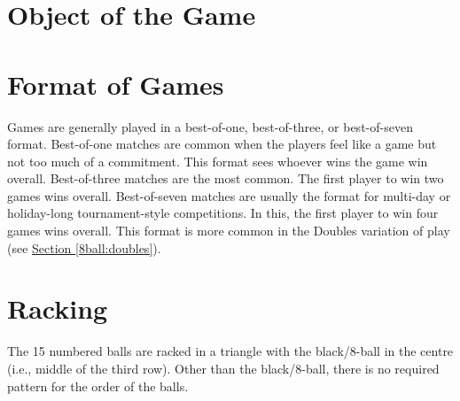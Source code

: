 
\section{Object of the Game} \label{8ball:description}

\section{Format of Games} \label{8ball:format}
 Games are generally played in a best-of-one, best-of-three, or best-of-seven format.%
\subruleitem Best-of-one matches are common when the players feel like a game but not too much of a commitment. This format sees whoever wins the game win overall.%
\subruleitem Best-of-three matches are the most common. The first player to win two games wins overall.%
\subruleitem Best-of-seven matches are usually the format for multi-day or holiday-long tournament-style competitions. In this, the first player to win four games wins overall. This format is more common in the Doubles variation of play (see \hyperref[8ball:doubles]{Section \ref*{8ball:doubles}}).%

\section{Racking} \label{8ball:racking}
 \RackingUp[8ball]%
\label{8ball:challengerracks}\DetermineWhoRacks%
\label{8ball:rackpos}\TableDiagram[8ball]%
\subruleitem The 15 numbered balls are racked in a triangle with the black/8-ball in the centre (i.e., middle of the third row). Other than the black/8-ball, there is no required pattern for the order of the balls.%
\subruleitem \TightlyPacked%
\subruleitem \RackPlacement[8ball]%
\subruleitem \RackingTool[8ball]%
\subruleitem \RackInspection[8ball]%

